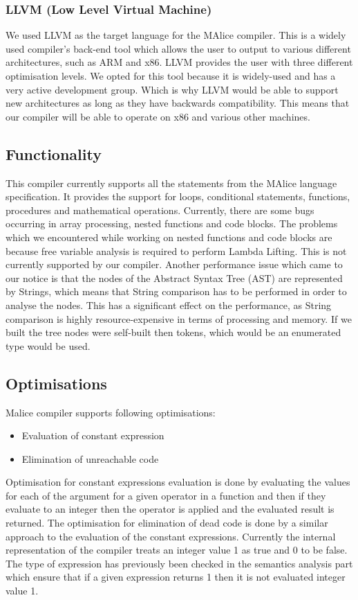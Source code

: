 \documentclass[a4wide, 11pt]{article}
\begin{document}
		\subsubsection{LLVM (Low Level Virtual Machine)}
			We used LLVM as the target language for the MAlice compiler. This is a widely used compiler's back-end tool which
			allows the user to output to various different architectures, such as ARM and x86. LLVM provides the user
			with three different optimisation levels. We opted for this tool because
			it is widely-used and has a very active development group. Which is why LLVM would be able to support new architectures as long as they have backwards compatibility. This means that our compiler will be able to operate on x86 and various other machines.
		
	\subsection{Functionality}			
		This compiler currently supports all the statements from the MAlice language specification. It provides
		the support for loops, conditional statements, functions, procedures and mathematical operations. Currently, there are some bugs
		occurring in array processing, nested functions and code blocks. The problems which we encountered while working on 
		nested functions and code blocks are because free variable analysis is required to perform Lambda Lifting. This is not currently supported by our compiler. Another performance issue which came to our notice is that the nodes of the Abstract Syntax Tree (AST) are represented by Strings, which means that String comparison has to be performed in order to analyse the nodes. This has a significant effect on the performance, as String comparison is highly resource-expensive in terms of processing and memory.
		If we built the tree nodes were self-built then tokens, which would be an enumerated type would be used.
	
	\subsection{Optimisations}
		Malice compiler supports following optimisations:
		\begin{itemize}
			\item Evaluation of constant expression
			\item Elimination of unreachable code
		\end{itemize} 
		Optimisation for constant expressions evaluation is done by evaluating the values for each of the argument for a given operator in a function
		and then if they evaluate to an integer then the operator is applied and the evaluated result is returned. The optimisation
		for elimination of dead code is done by a similar approach to the evaluation of the constant expressions. Currently 
		the internal representation of the compiler treats an integer value 1 as true and 0 to be false. The type of expression has
		previously been checked in the semantics analysis part which ensure that if a given expression returns 1 then it is not 
		evaluated integer value 1.
	
\end{document}
